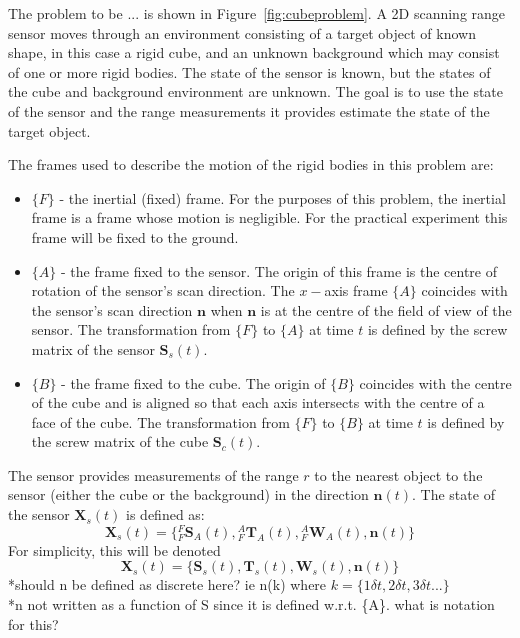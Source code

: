 The problem to be ... is shown in Figure~\ref{fig:cubeproblem}. A 2D scanning range sensor moves through an environment consisting of a target object of known shape, in this case a rigid cube, and an unknown background which may consist of one or more rigid bodies. The state of the sensor is known, but the states of the cube and background environment are unknown. The goal is to use the state of the sensor and the range measurements it provides estimate the state of the target object.

The frames used to describe the motion of the rigid bodies in this problem are:
\begin{itemize}
\item $\{F\}$ - the inertial (fixed) frame. For the purposes of this problem, the inertial frame is a frame whose motion is negligible. For the practical experiment this frame will be fixed to the ground.
\item $\{A\}$ - the frame fixed to the sensor. The origin of this frame is the centre of rotation of the sensor's scan direction. The $x-$axis frame $\{A\}$ coincides with the sensor's scan direction $\mathbf{n}$ when $\mathbf{n}$ is at the centre of the field of view of the sensor. The transformation from $\{F\}$ to $\{A\}$ at time $t$ is defined by the screw matrix of the sensor $\mathbf{S}_{s}(t)$.
\item $\{B\}$ - the frame fixed to the cube. The origin of $\{B\}$ coincides with the centre of the cube and is aligned so that each axis intersects with the centre of a face of the cube. The transformation from $\{F\}$ to $\{B\}$ at time $t$ is defined by the screw matrix of the cube $\mathbf{S}_{c}(t)$.
\end{itemize} 

The sensor provides measurements of the range $r$ to the nearest object to the sensor (either the cube or the background) in the direction $\mathbf{n}(t)$. 
The state of the sensor $\mathbf{X}_{s}(t)$ is defined as:
\begin{equation}
	\mathbf{X}_{s}(t) = 
	\{{^{F}_{F}\mathbf{S}^{}_{A}(t)},{^{A}_{F}\mathbf{T}^{}_{A}(t)},{^{A}_{F}\mathbf{W}^{}_{A}(t)},
	\mathbf{n}(t)\}
\end{equation}
For simplicity, this will be denoted 
\begin{equation}
	\mathbf{X}_{s}(t) = 
	\{\mathbf{S}_{s}(t),\mathbf{T}_{s}(t),\mathbf{W}_{s}(t),\mathbf{n}(t)\}
\end{equation}
*should n be defined as discrete here? ie n(k) where $k = \{1\delta t,2\delta t,3\delta t...\}$\\
*n not written as a function of S since it is defined w.r.t. \{A\}. what is notation for this?

